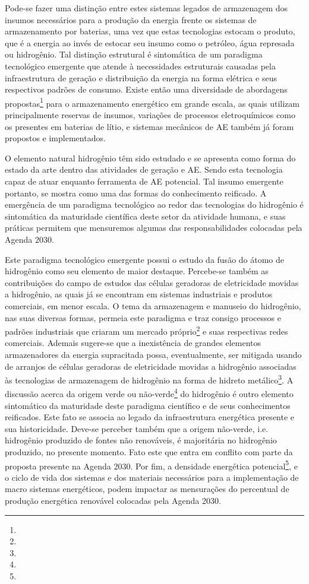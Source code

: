 Pode-se fazer uma distinção entre estes sistemas legados de armazenagem dos insumos necessários para a produção da energia frente os sistemas de armazenamento por baterias, uma vez que estas tecnologias estocam o produto, que é a energia ao invés de estocar seu insumo como o petróleo, água represada ou hidrogênio. Tal distinção estrutural é sintomática de um paradigma tecnológico emergente que atende à necessidades estruturais causadas pela infraestrutura de geração e distribuição da energia na forma elétrica e seus respectivos padrões de consumo. Existe então uma diversidade de abordagens propostas\footnote{} para o armazenamento energético em grande escala, as quais utilizam principalmente reservas de insumos, variações de processos eletroquímicos como os presentes em baterias de lítio, e sistemas mecânicos de AE também já foram propostos e implementados.

O elemento natural hidrogênio têm sido estudado e se apresenta como forma do estado da arte dentro das atividades de geração e AE. Sendo esta tecnologia capaz de atuar enquanto ferramenta de AE potencial. Tal insumo emergente portanto, se mostra como uma das formas do conhecimento reificado. A emergência de um paradigma tecnológico ao redor das tecnologias do hidrogênio é sintomática da maturidade científica deste setor da atividade humana, e suas práticas permitem que mensuremos algumas das responsabilidades colocadas pela Agenda 2030. 

Este paradigma tecnológico emergente possui o estudo da fusão do átomo de hidrogênio como seu elemento de maior destaque. Percebe-se também as contribuições do campo de estudos das células geradoras de eletricidade movidas a hidrogênio, as quais já se encontram em sistemas industriais e produtos comerciais, em menor escala. O tema da armazenagem e manuseio do hidrogênio, nas suas diversas formas, permeia este paradigma e traz consigo processos e padrões industriais que criaram um mercado próprio\footnote{} e suas respectivas redes comerciais. Ademais sugere-se que a inexistência de grandes elementos armazenadores da energia supracitada possa, eventualmente, ser mitigada usando de arranjos de células geradoras de eletricidade movidas a hidrogênio associadas às tecnologias de armazenagem de hidrogênio na forma de hidreto metálico\footnote{}. A discussão acerca da origem verde ou não-verde\footnote{} do hidrogênio é outro elemento sintomático da maturidade deste paradigma científico e de seus conhecimentos reificados. Este fato se associa ao legado da infraestrutura energética presente e sua historicidade. Deve-se perceber também que a origem não-verde, i.e. hidrogênio produzido de fontes não renováveis, é majoritária no hidrogênio produzido, no presente momento. Fato este que entra em conflito com parte da proposta presente na Agenda 2030. Por fim, a densidade energética potencial\footnote{}, e o ciclo de vida dos sistemas e dos materiais necessários para a implementação de macro sistemas energéticos, podem impactar as mensurações do percentual de produção energética renovável colocadas pela Agenda 2030.

